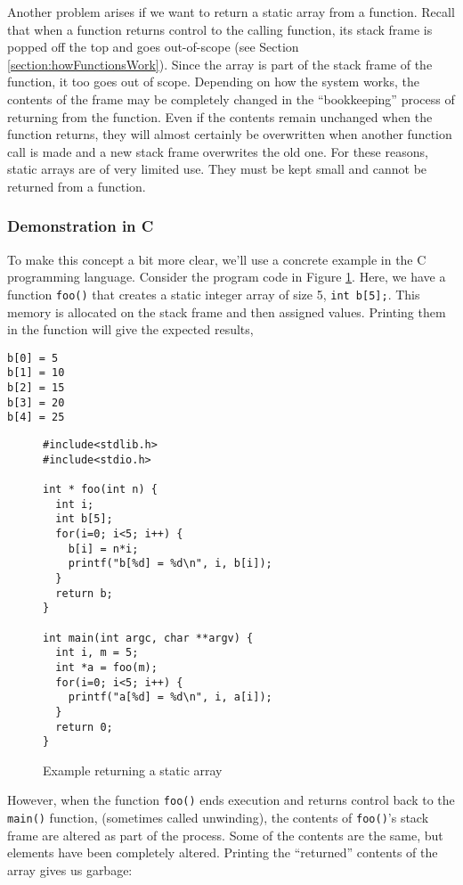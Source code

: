 Another problem arises if we want to return a static array from
a function.  Recall that when a function returns control to the 
calling function, its stack frame is popped off the top and 
goes out-of-scope (see Section \ref{section:howFunctionsWork}).
Since the array is part of the stack frame of the function, it
too goes out of scope.  Depending on how the system works, 
the contents of the frame may be completely changed in the
``bookkeeping'' process of returning from the function.  Even
if the contents remain unchanged when the function returns,
they will almost certainly be overwritten when another function
call is made and a new stack frame overwrites the old one.
For these reasons, static arrays are of very limited use.  They
must be kept small and cannot be returned from a function.

\subsubsection{Demonstration in C}

To make this concept a bit more clear, we'll use a concrete
example in the C programming language.  Consider the 
program code in Figure \ref{code:returnStaticArray}.  Here,
we have a function \texttt{foo()} that creates a
static integer array of size 5, \texttt{int b[5];}.  This
memory is allocated on the stack frame and then assigned
values.  Printing them in the function will give the expected
results, 

\begin{verbatim}
b[0] = 5
b[1] = 10
b[2] = 15
b[3] = 20
b[4] = 25
\end{verbatim}

\begin{figure}[H]
\centering
\begin{verbatim}
#include<stdlib.h>
#include<stdio.h>

int * foo(int n) {
  int i;
  int b[5];
  for(i=0; i<5; i++) {
    b[i] = n*i;
    printf("b[%d] = %d\n", i, b[i]);
  }
  return b;
}

int main(int argc, char **argv) {
  int i, m = 5;
  int *a = foo(m);
  for(i=0; i<5; i++) {
    printf("a[%d] = %d\n", i, a[i]);
  }
  return 0;
}
\end{verbatim}
\caption{Example returning a static array}
\label{code:returnStaticArray}
\end{figure}

However, when the function \texttt{foo()} ends execution and 
returns control back to the \texttt{main()} function, (sometimes 
called \gls{unwinding}), the contents of \texttt{foo()}'s stack
frame are altered as part of the process.  Some of the contents are the
same, but elements have been completely altered.  Printing the ``returned'' 
contents of the array gives us garbage:  


